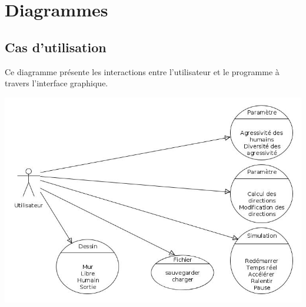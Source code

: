 %
\section{Diagrammes}
%
\subsection{Cas d'utilisation}
%
Ce diagramme présente les interactions entre l'utilisateur et le programme à travers l'interface graphique.
%
\begin{center}
\includegraphics[scale=0.65]{./illustration/casDutilisation}
\end{center}
%

%
\newpage
%
